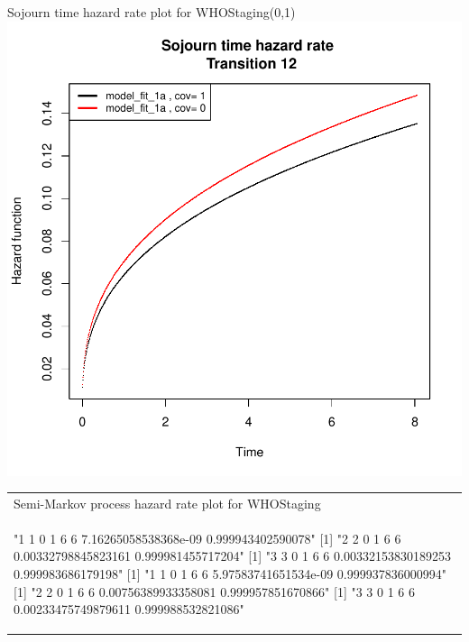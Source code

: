 \documentclass[11pt,a4paper]{article}
\begin{document}
\begin{enumerate}
\begin{minipage}{0.45\textwidth}
Sojourn time hazard rate plot for WHOStaging(0,1)\\
\includegraphics{SemiMarkov_Paper-011}
\end{minipage}%
\begin{minipage}{0.45\textwidth}
\begin{tabular}{|p{\textwidth}}
Semi-Markov process hazard rate plot for WHOStaging\\
\begin{Schunk}
\begin{Soutput}
[1] "1 1 0 1 6 6 7.16265058538368e-09 0.999943402590078"
[1] "2 2 0 1 6 6 0.00332798845823161 0.999981455717204"
[1] "3 3 0 1 6 6 0.00332153830189253 0.999983686179198"
[1] "1 1 0 1 6 6 5.97583741651534e-09 0.999937836000994"
[1] "2 2 0 1 6 6 0.00756389933358081 0.999957851670866"
[1] "3 3 0 1 6 6 0.00233475749879611 0.999988532821086"
\end{Soutput}
\end{Schunk}

\end{tabular}
\end{minipage}
\end{enumerate}
\end{document}
